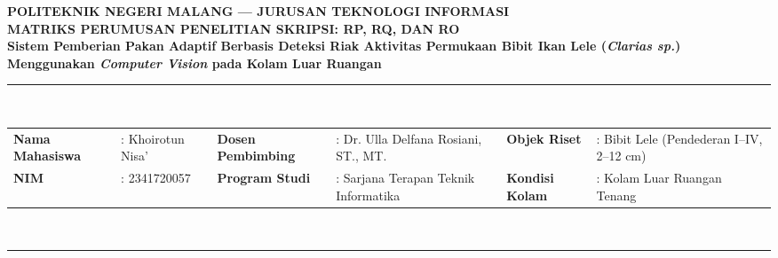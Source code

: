 \documentclass[10pt,a4paper]{article}
\begin{document}

\begin{center}
    {\large \textbf{\color{navy}POLITEKNIK NEGERI MALANG --- JURUSAN TEKNOLOGI INFORMASI}}\\[2pt]
    {\Large \textbf{\color{navy}MATRIKS PERUMUSAN PENELITIAN SKRIPSI: RP, RQ, DAN RO}}\\[2pt]
    {\normalsize \textbf{Sistem Pemberian Pakan Adaptif Berbasis Deteksi Riak Aktivitas Permukaan Bibit Ikan Lele (\textit{Clarias sp.}) Menggunakan \textit{Computer Vision} pada Kolam Luar Ruangan}}\\[4pt]
    \rule{\textwidth}{1.2pt}\\[3pt]
    
    \footnotesize
    \begin{tabular}{p{3.2cm} p{5.6cm} p{3.2cm} p{5.6cm} p{3.0cm} p{4.5cm}}
        \textbf{Nama Mahasiswa} & : Khoirotun Nisa' & \textbf{Dosen Pembimbing} & : Dr. Ulla Delfana Rosiani, ST., MT. & \textbf{Objek Riset} & : Bibit Lele (Pendederan I--IV, 2--12 cm) \\
        \textbf{NIM} & : 2341720057 & \textbf{Program Studi} & : Sarjana Terapan Teknik Informatika & \textbf{Kondisi Kolam} & : Kolam Luar Ruangan Tenang \\
    \end{tabular}\\[1pt]
    \rule{\textwidth}{0.6pt}
\end{center}

\vspace{-0.2cm}
\end{document}
